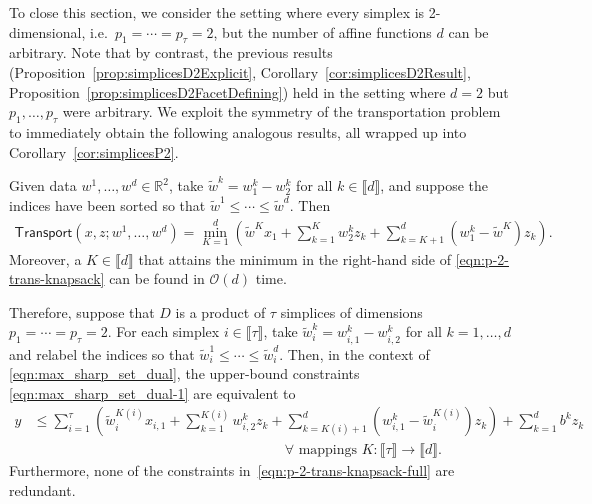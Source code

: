 \documentclass[smallextended]{svjour3}
\newcommand{\bbR}{\mathbb{R}}
\newcommand{\trans}{\mathsf{Transport}}
\newcommand{\tw}{\widetilde{w}}
\begin{document}

To close this section, we consider the setting where every simplex is 2-dimensional, i.e.\ $p_1=\cdots=p_{\tau}=2$, but the number of affine functions $d$ can be arbitrary.
Note that by contrast, the previous results (Proposition~\ref{prop:simplicesD2Explicit}, Corollary~\ref{cor:simplicesD2Result}, Proposition~\ref{prop:simplicesD2FacetDefining}) held in the setting where $d=2$ but $p_1,\ldots,p_{\tau}$ were arbitrary.
We exploit the symmetry of the transportation problem to immediately obtain the following analogous results, all wrapped up into Corollary~\ref{cor:simplicesP2}.

\begin{corollary} \label{cor:simplicesP2}
Given data $w^1, \ldots, w^d \in \bbR^2$, take $\tw^k = w^k_1 - w^k_2$ for all $k\in\llbracket d\rrbracket$, and suppose the indices have been sorted so that
$\tw^1\le\cdots\le\tw^d$.
Then
\begin{align} \label{eqn:p-2-trans-knapsack}
\trans(x,z;w^1,\ldots,w^d)=\min_{K=1}^d\left(\tw^Kx_1+\sum_{k=1}^{K}w^k_2z_k+\sum_{k=K+1}^{d}(w^k_1-\tw^K)z_k\right).
\end{align}
Moreover, a $K \in \llbracket d \rrbracket$ that attains the minimum in the right-hand side of \eqref{eqn:p-2-trans-knapsack} can be found in $\mathcal{O}(d)$ time.

Therefore, suppose that $D$ is a product of $\tau$ simplices of dimensions $p_1=\cdots=p_{\tau}=2$.
For each simplex $i\in\llbracket\tau\rrbracket$, take $\tw^k_i=w^k_{i,1}-w^k_{i,2}$ for all $k=1,\ldots,d$ and relabel the indices so that $\tw^1_i\le\cdots\le\tw^d_i$.
Then, in the context of \eqref{eqn:max_sharp_set_dual}, the upper-bound constraints \eqref{eqn:max_sharp_set_dual-1} are equivalent to
\begin{align}
y &\le\sum_{i=1}^{\tau}\left(\tw^{K(i)}_ix_{i,1}+\sum_{k=1}^{K(i)}w^k_{i,2}z_k+\sum_{k=K(i)+1}^{d}(w^k_{i,1}-\tw^{K(i)}_i)z_k\right)+\sum_{k=1}^db^kz_k \nonumber \\
&\hspace{18em}\forall\text{ mappings $K:\llbracket\tau\rrbracket\to\llbracket d\rrbracket$.} \label{eqn:p-2-trans-knapsack-full}
\end{align}
Furthermore, none of the constraints in~\eqref{eqn:p-2-trans-knapsack-full} are redundant.
\end{corollary}
\end{document}
